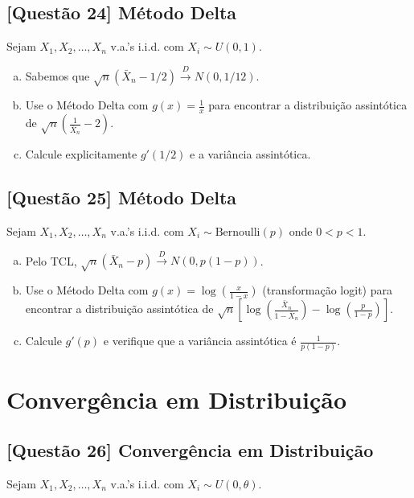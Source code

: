 \documentclass[12pt,a4paper]{article}
\begin{document}
\subsection*{[Questão 24] Método Delta}

Sejam $X_1, X_2, \ldots, X_n$ v.a.'s i.i.d. com $X_i \sim U(0, 1)$.

\begin{enumerate}[(a)]
    \item Sabemos que $\sqrt{n}(\bar{X}_n - 1/2) \xrightarrow{D} N(0, 1/12)$.
    \item Use o Método Delta com $g(x) = \frac{1}{x}$ para encontrar a distribuição assintótica de $\sqrt{n}\left(\frac{1}{\bar{X}_n} - 2\right)$.
    \item Calcule explicitamente $g'(1/2)$ e a variância assintótica.
\end{enumerate}

\subsection*{[Questão 25] Método Delta}

Sejam $X_1, X_2, \ldots, X_n$ v.a.'s i.i.d. com $X_i \sim \text{Bernoulli}(p)$ onde $0 < p < 1$.

\begin{enumerate}[(a)]
    \item Pelo TCL, $\sqrt{n}(\bar{X}_n - p) \xrightarrow{D} N(0, p(1-p))$.
    \item Use o Método Delta com $g(x) = \log\left(\frac{x}{1-x}\right)$ (transformação logit) para encontrar a distribuição assintótica de $\sqrt{n}\left[\log\left(\frac{\bar{X}_n}{1-\bar{X}_n}\right) - \log\left(\frac{p}{1-p}\right)\right]$.
    \item Calcule $g'(p)$ e verifique que a variância assintótica é $\frac{1}{p(1-p)}$.
\end{enumerate}

\section{Convergência em Distribuição}

\subsection*{[Questão 26] Convergência em Distribuição}

Sejam $X_1, X_2, \ldots, X_n$ v.a.'s i.i.d. com $X_i \sim U(0, \theta)$.
\end{document}
